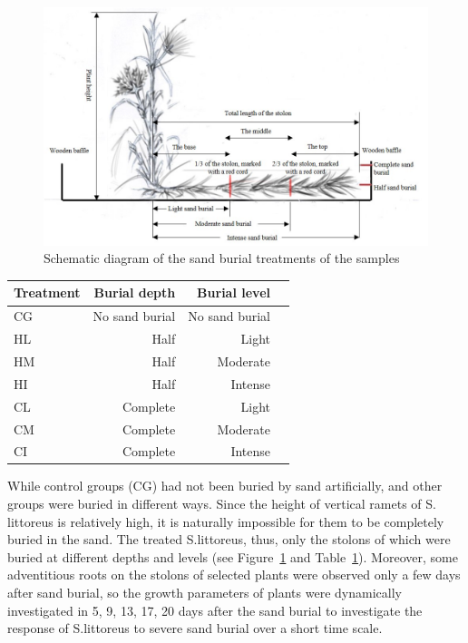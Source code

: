 \documentclass[]{interact}
\theoremstyle{plain}%
\theoremstyle{definition}
\theoremstyle{remark}
\begin{document}
\begin{figure}
  \centering
  \includegraphics[scale=0.5]{../figs/diagram.jpg}
  \caption{Schematic diagram of the sand burial treatments of the samples} 
  \label{fig:diagram}
\end{figure}

\begin{table}
  {\begin{tabular}{lrrr} 
  \toprule
   Treatment & Burial depth & Burial level \\ 
  \midrule
   CG & No sand burial & No sand burial \\
   HL & Half & Light \\
   HM & Half & Moderate \\
   HI & Half & Intense \\
   CL & Complete & Light \\
   CM & Complete & Moderate \\
   CI & Complete & Intense \\
  \bottomrule
  \end{tabular}}
  \label{tab:treatment}
\end{table}

While control groups (CG) had not been buried by sand artificially, and other groups were buried in different ways. Since the height of vertical ramets of S. littoreus is relatively high, it is naturally impossible for them to be completely buried in the sand. The treated S.littoreus, thus, only the stolons of which were buried at different depths and levels (see Figure~\ref{fig:diagram} and Table~\ref{tab:treatment}). Moreover, some adventitious roots on the stolons of selected plants were observed only a few days after sand burial, so the growth parameters of plants were dynamically investigated in 5, 9, 13, 17, 20 days after the sand burial to investigate the response of S.littoreus to severe sand burial over a short time scale.
\end{document}
